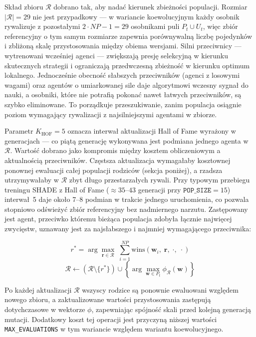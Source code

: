 Skład zbioru $\mathcal{R}$ dobrano tak, aby nadać kierunek zbieżności populacji. Rozmiar $|\mathcal{R}| = 29$ nie jest przypadkowy --- w wariancie koewolucyjnym każdy osobnik rywalizuje z pozostałymi $2 \cdot NP - 1 = 29$ osobnikami puli $P_t \cup U_t$, więc zbiór referencyjny o tym samym rozmiarze zapewnia porównywalną liczbę pojedynków i zbliżoną skalę przystosowania między obiema wersjami. Silni przeciwnicy — wytrenowani wcześniej agenci — zwiększają presję selekcyjną w kierunku skutecznych strategii i ograniczają przedwczesną zbieżność w kierunku optimum lokalnego. Jednocześnie obecność słabszych przeciwników (agenci z losowymi wagami) oraz agentów o umiarkowanej sile daje algorytmowi wczesny sygnał do nauki, a osobniki, które nie potrafią pokonać nawet łatwych przeciwników, są szybko eliminowane. To porządkuje przeszukiwanie, zanim populacja osiągnie poziom wymagający rywalizacji z najsilniejszymi agentami w zbiorze.

Parametr $K_{\text{HOF}} = 5$ oznacza interwał aktualizacji Hall of Fame wyrażony w generacjach --- co piątą generację wykonywana jest podmiana jednego agenta w $\mathcal{R}$. Wartość dobrano jako kompromis między kosztem obliczeniowym a aktualnością przeciwników. Częstsza aktualizacja wymagałaby kosztownej ponownej ewaluacji całej populacji rodziców (sekcja poniżej), a rzadsza utrzymywałaby w $\mathcal{R}$ zbyt długo przestarzałych rywali. Przy typowym przebiegu treningu SHADE z Hall of Fame ($\approx 35$--$43$ generacji przy $\texttt{POP\_SIZE} = 15$) interwał~5 daje około 7--8 podmian w trakcie jednego uruchomienia, co pozwala stopniowo odświeżyć zbiór referencyjny bez nadmiernego narzutu. Zastępowany jest agent, przeciwko któremu bieżąca populacja zdobyła łącznie najwięcej zwycięstw, uznawany jest za najsłabszego i najmniej wymagającego przeciwnika:

\begin{equation}
    r^* = \arg\max_{\mathbf{r} \in \mathcal{R}}\;
        \sum_{i=1}^{NP} \text{wins}(\mathbf{w}_i,\; \mathbf{r},\;
        \cdot,\; \cdot)
\end{equation}
\begin{equation}
    \mathcal{R} \leftarrow
        (\mathcal{R} \setminus \{r^*\}) \cup
        \left\{\arg\max_{\mathbf{w} \in P_t}
        \phi_{\mathcal{R}}(\mathbf{w})\right\}
\end{equation}

Po każdej aktualizacji $\mathcal{R}$ wszyscy rodzice są ponownie ewaluowani względem nowego zbioru, a zaktualizowane wartości przystosowania zastępują dotychczasowe w wektorze $\phi$, zapewniając spójność skali przed kolejną generacją mutacji. Dodatkowy koszt tej operacji jest przyczyną niższej wartości \texttt{MAX\_EVALUATIONS} w tym wariancie względem wariantu koewolucyjnego.
